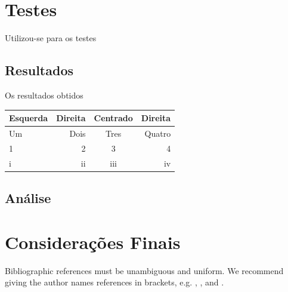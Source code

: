 \documentclass[12pt]{article}
\begin{document}
\section{Testes}\label{sec:testes}
	
	Utilizou-se para os testes 

	\subsection{Resultados}\label{sec:resultados}
		
		Os resultados obtidos 

		\begin{tabular}{l|r|c|r} \hline
			Esquerda & Direita & Centrado & Direita \\ \hline
			Um & Dois & Tres & Quatro \\
			1 & 2 & 3 & 4 \\
			i & ii & iii & iv \\ \hline
		\end{tabular}
		
	\subsection{Análise}\label{sec:analise}

\section{Considerações Finais}\label{sec:conclusao}

	Bibliographic references must be unambiguous and uniform.  We recommend giving the author names references in brackets, e.g. \cite{knuth:84}, \cite{boulic:91}, and \cite{smith:99}.




\end{document}
